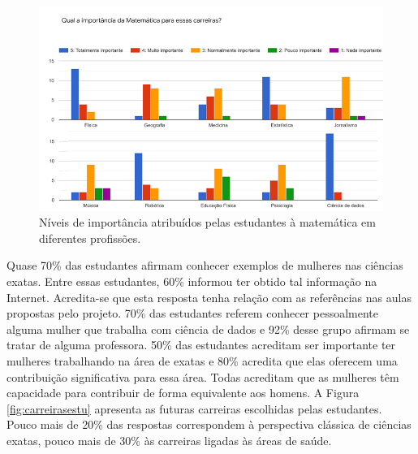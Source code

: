 \documentclass[
]{book}
\begin{document}
\begin{figure}

{\centering \includegraphics[width=1\linewidth,height=0.8\textheight]{images/image41} 

}

\caption{ Níveis de importância atribuídos pelas estudantes à matemática em diferentes profissões.}\label{fig:nivprofestu}
\end{figure}

Quase 70\% das estudantes afirmam conhecer exemplos de mulheres nas ciências exatas. Entre essas estudantes, 60\% informou ter obtido tal informação na Internet. Acredita-se que esta resposta tenha relação com as referências nas aulas propostas pelo projeto. 70\% das estudantes referem conhecer pessoalmente alguma mulher que trabalha com ciência de dados e 92\% desse grupo afirmam se tratar de alguma professora.
50\% das estudantes acreditam ser importante ter mulheres trabalhando na área de exatas e 80\% acredita que elas oferecem uma contribuição significativa para essa área. Todas acreditam que as mulheres têm capacidade para contribuir de forma equivalente aos homens. A Figura \ref{fig:carreirasestu} apresenta as futuras carreiras escolhidas pelas estudantes. Pouco mais de 20\% das respostas correspondem à perspectiva clássica de ciências exatas, pouco mais de 30\% às carreiras ligadas às áreas de saúde.
\end{document}
